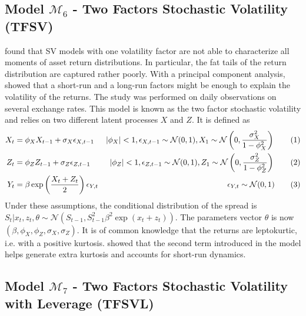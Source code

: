 \documentclass[11pt,a4,twosided,singlespacing,titlepagenumber=on]{scrreprt}
\numberwithin{equation}{chapter} %
\theoremstyle{remark}
\newcommand\numberthis{\addtocounter{equation}{1}\tag{\theequation}}
\begin{document}
\subsection{Model $\mathcal{M}_6$ - Two Factors Stochastic Volatility (TFSV)}
\cite{chernov2000} found that SV models with one volatility factor are not able to characterize all moments of asset return distributions. In particular, the fat tails of the return distribution are captured rather poorly. With a principal component analysis, \cite{harvey1994} showed that a short-run and a long-run factors might be enough to explain the volatility of the returns. The study was performed on daily observations on several exchange rates. This model is known as the two factor stochastic volatility and relies on two different latent processes $X$ and $Z$. It is defined as
\begin{align*}
  X_t 						&=  \phi_X X_{t-1} + \sigma_X \epsilon_{X,t-1} &|\phi_X| < 1, \epsilon_{X,t-1} \sim \mathcal{N}(0,1), X_1 \sim \mathcal{N} \left(0, \frac{\sigma_X^2}{1 - \phi_X^2} \right) \numberthis \label{tfsv_process_X} \\
  Z_t 						&=  \phi_Z Z_{t-1} + \sigma_Z \epsilon_{Z,t-1} &|\phi_Z| < 1, \epsilon_{Z,t-1} \sim \mathcal{N}(0,1), Z_1 \sim \mathcal{N} \left(0, \frac{\sigma_Z^2}{1 - \phi_Z^2} \right) \numberthis\\
  Y_t 						&=  \beta \exp \left( \frac{X_t+Z_t}{2} \right) \epsilon_{Y,t} &\epsilon_{Y,t} \sim \mathcal{N}(0,1) \numberthis
\end{align*}
Under these assumptions, the conditional distribution of the spread is $S_t | x_t, z_t, \theta \sim \mathcal{N}\left(S_{t-1}, S_{t-1}^2 \beta^2 \exp \left(x_t + z_t\right) \right)$. The parameters vector $\theta$ is now $(\beta, \phi_X, \phi_Z, \sigma_X, \sigma_Z)$. It is of common knowledge that the returns are leptokurtic, i.e. with a positive kurtosis. \cite{veiga2006} showed that the second term introduced in the model helps generate extra kurtosis and accounts for short-run dynamics.

\subsection{Model $\mathcal{M}_7$ - Two Factors Stochastic Volatility with Leverage (TFSVL)}
\end{document}
